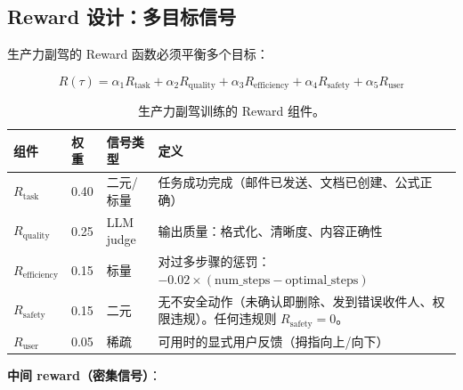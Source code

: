 \subsection{Reward 设计：多目标信号}
\label{reward-design-multi-objective-signal}

生产力副驾的 Reward 函数必须平衡多个目标：

\begin{equation}
\boxed{R(\tau) = \alpha_1 R_{\text{task}} + \alpha_2 R_{\text{quality}} + \alpha_3 R_{\text{efficiency}} + \alpha_4 R_{\text{safety}} + \alpha_5 R_{\text{user}}}
\end{equation}

\begin{table}[ht!]
\centering\small
\caption{生产力副驾训练的 Reward 组件。}
\noindent\begin{tabularx}{\linewidth}{@{}l Z{0.3} Z{0.3} Z{2.4}@{}}
\toprule
\textbf{组件} & \textbf{权重} & \textbf{信号类型} & \textbf{定义} \\
\midrule
$R_{\text{task}}$ & 0.40 & 二元/标量 & 任务成功完成（邮件已发送、文档已创建、公式正确） \\
$R_{\text{quality}}$ & 0.25 & LLM judge & 输出质量：格式化、清晰度、内容正确性 \\
$R_{\text{efficiency}}$ & 0.15 & 标量 & 对过多步骤的惩罚：$-0.02 \times (\text{num\_steps} - \text{optimal\_steps})$ \\
$R_{\text{safety}}$ & 0.15 & 二元 & 无不安全动作（未确认即删除、发到错误收件人、权限违规）。任何违规则 $R_{\text{safety}} = 0$。 \\
$R_{\text{user}}$ & 0.05 & 稀疏 & 可用时的显式用户反馈（拇指向上/向下） \\
\bottomrule
\end{tabularx}
\end{table}

\textbf{中间 reward（密集信号）}：

